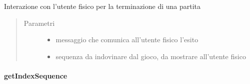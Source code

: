 \documentclass[letterpaper,10pt,italian,openany,oneside]{sphinxmanual}
\begin{document}
\begin{fulllineitems}
\label{\detokenize{source/it/unicam/cs/pa/mastermind/ui/GameView:it.unicam.cs.pa.mastermind.ui.GameView.endingScreen(String, List)}}
Interazione con l’utente fisico per la terminazione di una partita
\begin{quote}\begin{description}
\item[{Parametri}] \leavevmode\begin{itemize}
\item {} 
 \textendash{} messaggio che comunica all’utente fisico l’esito

\item {} 
 \textendash{} sequenza da indovinare dal gioco, da mostrare all’utente fisico

\end{itemize}

\end{description}\end{quote}

\end{fulllineitems}



\paragraph{getIndexSequence}
\label{\detokenize{source/it/unicam/cs/pa/mastermind/ui/GameView:getindexsequence}}
\end{document}
